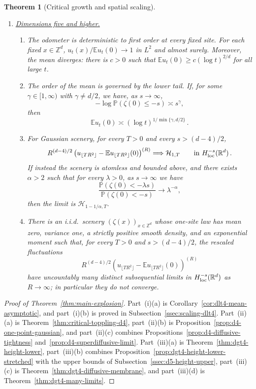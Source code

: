\documentclass[11pt]{amsart}
\theoremstyle{plain}
\newtheorem{theorem}{Theorem}[section]
\theoremstyle{definition}
\newcommand{\Z}{\mathbb{Z}}
\newcommand{\R}{\mathbb{R}}
\newcommand{\E}{\mathbb{E}}
\renewcommand{\P}{\mathbb{P}}
\begin{document}
\begin{theorem}[Critical growth and spatial scaling]
\begin{enumerate}[label=\textup{(\roman*)}]
\item \underline{\textup{Dimensions five and higher.}}
\begin{enumerate}[label=\textup{(\alph*)}]
	\item The odometer is deterministic to first order at every fixed site. For
	each fixed $x\in\Z^d$, $u_t(x)/\E u_t(0)\to1$ in $L^2$ and almost surely.
	Moreover, the mean diverges: there is $c>0$ such that $\E u_t(0)\geq c(\log t)^{2/d}$ for all large $t$.
\item The order of the mean is governed by the lower tail. If, for some $\gamma\in[1,\infty)$ with $\gamma\ne d/2$, we have, as $s\to\infty$,
\[
    -\log\P(\zeta(0)\leq -s)\asymp s^\gamma,
\]
then
\[
    \E u_t(0)\asymp(\log t)^{1/\min\{\gamma,d/2\}}\, .
\]
\item For Gaussian scenery, for every $T>0$ and every $s>(d-4)/2$,
\[
    R^{(d-4)/2}
    \left( u_{\lfloor TR^2\rfloor}-\E u_{\lfloor TR^2\rfloor}(0) \right)^{(R)}
    \Longrightarrow \mathcal H_{1,T}
    \qquad\text{in }H^{-s}_{\rm loc}(\R^d)\, .
\]
If instead the scenery is atomless and bounded above, and there exists $\alpha>2$ such that for every $\lambda>0$, as $s\to\infty$ we have
\[
    \frac{\P(\zeta(0)<-\lambda s)}{\P(\zeta(0)<-s)}\longrightarrow\lambda^{-\alpha},
\]
then the limit is $\mathcal H_{1-1/\alpha,T}$.
\item There is an i.i.d.\ scenery $(\zeta(x))_{x\in\Z^d}$ whose one-site law has
mean zero, variance one, a strictly positive smooth density, and an exponential
moment such that, for every $T>0$ and $s>(d-4)/2$, the rescaled fluctuations
\[
    R^{(d-4)/2}\left(u_{\lfloor TR^2\rfloor}-\E u_{\lfloor TR^2\rfloor}(0)\right)^{(R)}
\]
have uncountably many distinct subsequential limits in $H^{-s}_{\rm loc}(\R^d)$ as
$R\to\infty$; in particular they do not converge.
\end{enumerate}
\end{enumerate}
\end{theorem}

\begin{proof}[Proof of Theorem~\ref{thm:main-explosion}]
Part~\textup{(i)(a)} is Corollary~\ref{cor:dlt4-mean-asymptotic}, and
part~\textup{(i)(b)} is proved in Subsection~\ref{ssec:scaling-dlt4}.
Part~\textup{(ii)(a)} is Theorem~\ref{thm:critical-toppling-d4},
part~\textup{(ii)(b)} is Proposition~\ref{prop:d4-one-point-gaussian}, and
part~\textup{(ii)(c)} combines Propositions~\ref{prop:d4-diffusive-tightness}
and~\ref{prop:d4-superdiffusive-limit}. Part~\textup{(iii)(a)} is
Theorem~\ref{thm:dgt4-height-lower}, part~\textup{(iii)(b)} combines
Proposition~\ref{prop:dgt4-height-lower-stretched} with the upper bounds of
Subsection~\ref{ssec:d5-height-upper}, part~\textup{(iii)(c)} is
Theorem~\ref{thm:dgt4-diffusive-membrane}, and part~\textup{(iii)(d)} is
Theorem~\ref{thm:dgt4-many-limits}.
\end{proof}
\end{document}
